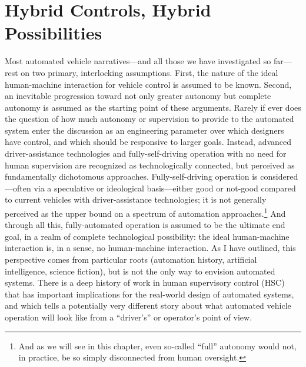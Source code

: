 \chapter{Hybrid Controls, Hybrid Possibilities}
\label{chap:4}



Most automated vehicle narratives---and all those we have investigated
so far---rest on two primary, interlocking assumptions. First, the nature of the
ideal human-machine interaction for vehicle control is assumed to be
known. Second, an inevitable progression toward not only greater
autonomy but complete autonomy is assumed as the
starting point of these arguments. Rarely if ever does the question of
how much autonomy or supervision to provide to the automated system
enter the discussion as an engineering parameter over which designers
have control, and which should be responsive to larger goals. Instead,
advanced driver-assistance technologies and fully-self-driving
operation with no need for human supervision are recognized as
technologically connected, but perceived as fundamentally dichotomous
approaches. Fully-self-driving operation is considered---often via a
speculative or ideological basis---either good or not-good compared to
current vehicles with driver-assistance technologies; it is not generally
perceived as the upper bound on a spectrum of automation
approaches.\footnote{And as we will see in this chapter, even
  so-called ``full'' autonomy would not, in practice, be so simply
  disconnected from human oversight.} And through all this,
fully-automated operation is assumed to be the ultimate end goal, in a
realm of complete technological possibility: the ideal human-machine
interaction is, in a sense, no human-machine interaction. As I have
outlined, this perspective comes from particular roots (automation
history, artificial intelligence, science fiction), but is not the
only way to envision automated systems. There is a deep history of
work in human supervisory control (HSC) that has important implications
for the real-world design of automated systems, and which tells a
potentially very different story about what automated vehicle
operation will look like from a ``driver's'' or operator's point of view.

